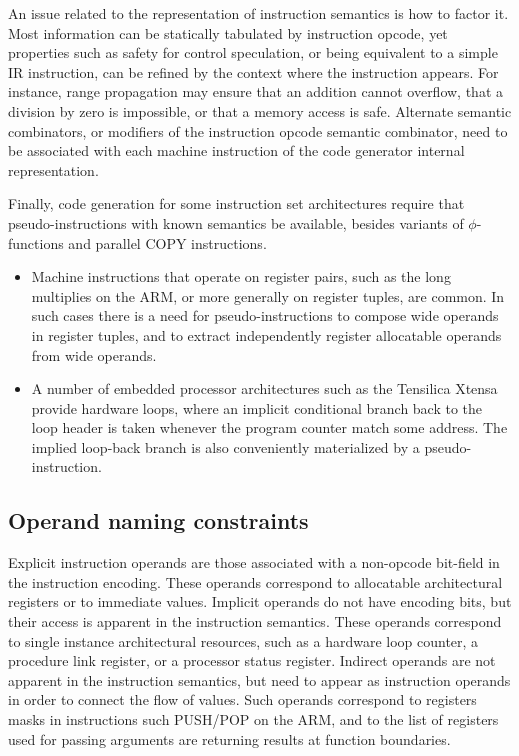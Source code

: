 An issue related to the representation of instruction semantics is how to factor
it. Most information can be statically tabulated by instruction opcode, yet
properties such as safety for control speculation, or being equivalent to a
simple IR instruction, can be refined by the context where the instruction
appears. For instance, range propagation may ensure that an addition cannot
overflow, that a division by zero is impossible, or that a memory access is safe.
Alternate semantic combinators, or modifiers of the instruction opcode semantic
combinator, need to be associated with each machine instruction of the code
generator internal representation.

Finally, code generation for some instruction set architectures require that
pseudo-instructions with known semantics be available, besides variants of
$\phi$-functions and parallel COPY instructions. \begin{itemize}
\item Machine instructions that
operate on register pairs, such as the long multiplies on the ARM, or more
generally on register tuples, are common. In such cases there is a need for
pseudo-instructions to compose wide operands in register tuples, and to extract
independently register allocatable operands from wide operands.
\item A number of embedded processor architectures such as the Tensilica Xtensa
provide hardware loops, where an implicit conditional branch back to the loop
header is taken whenever the program counter match some address. The implied
loop-back branch is also conveniently materialized by a pseudo-instruction.
\end{itemize}

\subsection{Operand naming constraints}

Explicit instruction operands are those associated with a non-opcode bit-field
in the instruction encoding. These operands correspond to allocatable
architectural registers or to immediate values. Implicit operands do not have
encoding bits, but their access is apparent in the instruction semantics. These
operands correspond to single instance architectural resources, such as a
hardware loop counter, a procedure link register, or a processor status
register. Indirect operands are not apparent in the instruction semantics, but
need to appear as instruction operands in order to connect the flow of values.
Such operands correspond to registers masks in instructions such PUSH/POP on the
ARM, and to the list of registers used for passing arguments are returning
results at function boundaries.

